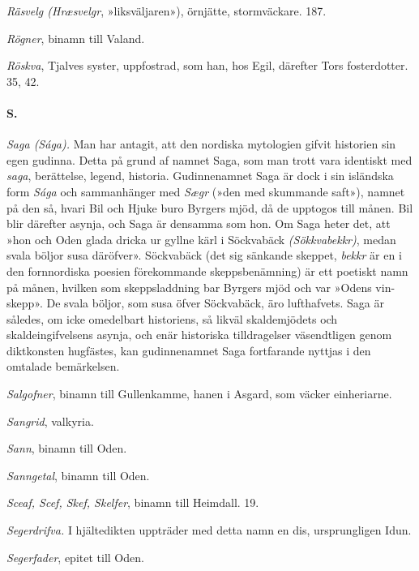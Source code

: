 \emph{Räsvelg (Hræsvelgr}, »liksväljaren»), örnjätte, stormväckare. 187.

\emph{Rögner}, binamn till Valand.

\emph{Röskva}, Tjalves syster, uppfostrad, som han, hos Egil, därefter
Tors fosterdotter. 35, 42.

\paragraph{S.}

\emph{Saga (Sága).} Man har antagit, att den nordiska mytologien gifvit
historien sin egen gudinna. Detta på grund af namnet Saga, som man trott
vara identiskt med \emph{saga}, berättelse, legend, historia.
Gudinnenamnet Saga är dock i sin isländska form \emph{Sága} och
sammanhänger med \emph{Sægr} (»den med skummande saft»), namnet på den
så, hvari Bil och Hjuke buro Byrgers mjöd, då de upptogos till månen.
Bil blir därefter asynja, och Saga är densamma som hon. Om Saga heter
det, att »hon och Oden glada dricka ur gyllne kärl i Söckvabäck
\emph{(Sökkvabekkr)}, medan svala böljor susa däröfver». Söckvabäck (det
sig sänkande skeppet, \emph{bekkr} är en i den fornnordiska poesien
förekommande skeppsbenämning) är ett poetiskt namn på månen, hvilken som
skeppsladdning bar Byrgers mjöd och var »Odens vin-skepp». De svala
böljor, som susa öfver Söckvabäck, äro lufthafvets. Saga är således, om
icke omedelbart historiens, så likväl skaldemjödets och
skaldeingifvelsens asynja, och enär historiska tilldragelser
väsendtligen genom diktkonsten hugfästes, kan gudinnenamnet Saga
fortfarande nyttjas i den omtalade bemärkelsen.

\emph{Salgofner}, binamn till Gullenkamme, hanen i Asgard, som väcker
einheriarne.

\emph{Sangrid}, valkyria.

\emph{Sann}, binamn till Oden.

\emph{Sanngetal}, binamn till Oden.

\emph{Sceaf, Scef, Skef, Skelfer}, binamn till Heimdall. 19.

\emph{Segerdrifva.} I hjältedikten uppträder med detta namn en dis,
ursprungligen Idun.

\emph{Segerfader}, epitet till Oden.

\protect\hypertarget{lb1625905.xhtmlux5cux23start237}{}{}\protect\hypertarget{lb1625905.xhtmlux5cux23start237-a}{}{}\protect\hypertarget{lb1625905.xhtmlux5cux23start237-b}{}{}\protect\hypertarget{lb1625905.xhtmlux5cux23start237-c}{}{}\protect\hypertarget{lb1625905.xhtmlux5cux23start237-d}{}{}

